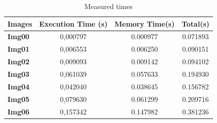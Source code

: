 \documentclass[a4paper]{article}
\begin{document}
\begin{table}[!ht]
\centering
\begin{tabular}{|l|c|c|c|}
\hline
\textbf{Images} & \textbf{Execution Time (s)} & \textbf{Memory Time(s)} & \textbf{Total(s)} \\ \hline
\textbf{Img00}  & 0,000797                    & 0.000977                & 0.071893          \\ \hline
\textbf{Img01}  & 0,006553                    & 0.006250                & 0.090151          \\ \hline
\textbf{Img02}  & 0,009093                    & 0.009142                & 0.094102          \\ \hline
\textbf{Img03}  & 0,061039                    & 0.057633                & 0.194930          \\ \hline
\textbf{Img04}  & 0,042040                    & 0.038645                & 0.156782          \\ \hline
\textbf{Img05}  & 0,079630                    & 0.061299                & 0.209716          \\ \hline
\textbf{Img06}  & 0,157342                    & 0.147982                & 0.381236          \\ \hline
\end{tabular}
\caption{Measured times}
\label{tab:smooth_me}
\end{table}
\FloatBarrier
\end{document}
